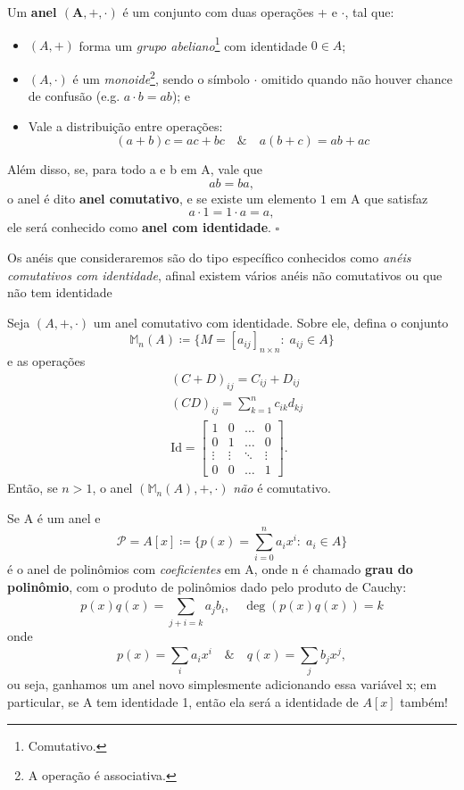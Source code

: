 \documentclass[../algebraIII_notes.tex]{subfiles}
\begin{document}
\begin{def*}
	Um \textbf{anel \(\mathbf{(A, +, \cdot )}\)} é um conjunto com duas operações + e \(\cdot \), tal que:
	\begin{itemize}
		\item \((A, +)\) forma um \textit{grupo abeliano}\footnote{Comutativo.} com identidade \(0\in A\);
		\item \((A, \cdot )\) é um \textit{monoide}\footnote{A operação é associativa.}, sendo o símbolo \(\cdot \) omitido quando não houver chance de confusão (e.g. \(a \cdot b = ab\)); e
		\item Vale a distribuição entre operações:
		      \[
			      (a+b)c = ac + bc \quad\&\quad a(b+c) = ab + ac
		      \]
	\end{itemize}
	Além disso, se, para todo a e b em A, vale que
	\[
		ab = ba,
	\]
	o anel é dito \textbf{anel comutativo}, e se existe um elemento \(1\) em A que satisfaz
	\[
		a \cdot 1 = 1 \cdot a = a,
	\]
	ele será conhecido como \textbf{anel com identidade}. \(\square\)
\end{def*}
Os anéis que consideraremos são do tipo específico conhecidos como \textit{anéis comutativos com identidade}, afinal existem vários anéis não comutativos ou que não tem identidade
\begin{example}
	Seja \((A, +, \cdot )\) um anel comutativo com identidade. Sobre ele, defina o conjunto
	\[
		\mathbb{M}_{n}(A) \coloneqq \{M = [a_{ij}]_{n \times n}:\; a_{ij}\in A\}
	\]
	e as operações
	\begin{align*}
		 & (C+D)_{ij} = C_{ij}+D_{ij}                      \\
		 & (CD)_{ij} = \sum\limits_{k=1}^{n}c_{ik}d_{kj}   \\
		 & \mathrm{Id} = \begin{bmatrix}
			                 1      & 0      & \dotsc & 0      \\
			                 0      & 1      & \dotsc & 0      \\
			                 \vdots & \vdots & \ddots & \vdots \\
			                 0      & 0      & \dotsc & 1
		                 \end{bmatrix}.
	\end{align*}
	Então, se \(n>1\), o anel \((\mathbb{M}_{n}(A), +, \cdot )\) \textit{não} é comutativo.
\end{example}
\begin{example}
	Se A é um anel e
	\[
		\mathcal{P} = A[x] \coloneqq  \{p(x)=\sum\limits_{i=0}^{n}a_{i}x^{i}:\; a_{i}\in A\}
	\]
	é o anel de polinômios com \textit{coeficientes} em A, onde n é chamado \textbf{grau do polinômio}, com o produto de polinômios dado pelo produto de Cauchy:
	\[
		p(x)q(x) = \sum\limits_{j+i = k}^{}a_{j}b_{i},\quad \deg{(p(x)q(x))}=k
	\]
	onde
	\[
		p(x)=\sum\limits_{i}^{}a_{i}x^{i} \quad\&\quad q(x)=\sum\limits_{j}^{}b_{j}x^{j},
	\]
	ou seja, ganhamos um anel novo simplesmente adicionando essa variável x; em particular, se A tem identidade 1, então ela será a identidade de \(A[x]\) também!
\end{example}
\end{document}
